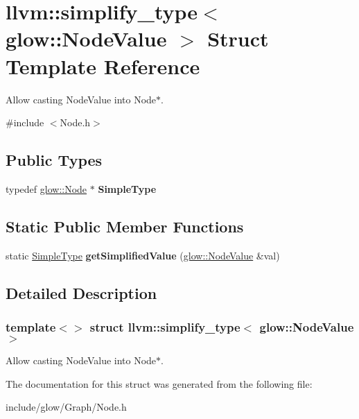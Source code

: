 \hypertarget{structllvm_1_1simplify__type_3_01glow_1_1_node_value_01_4}{}\section{llvm\+:\+:simplify\+\_\+type$<$ glow\+:\+:Node\+Value $>$ Struct Template Reference}
\label{structllvm_1_1simplify__type_3_01glow_1_1_node_value_01_4}


Allow casting Node\+Value into Node$\ast$.  




{\ttfamily \#include $<$Node.\+h$>$}

\subsection*{Public Types}
\begin{DoxyCompactItemize}
\item 
\mbox{\label{structllvm_1_1simplify__type_3_01glow_1_1_node_value_01_4_ac337e4d10cad8607f797b463a03d3c65}} 
typedef \hyperlink{classglow_1_1_node}{glow\+::\+Node} $\ast$ {\bfseries Simple\+Type}
\end{DoxyCompactItemize}
\subsection*{Static Public Member Functions}
\begin{DoxyCompactItemize}
\item 
\mbox{\label{structllvm_1_1simplify__type_3_01glow_1_1_node_value_01_4_a195a6248a7e70c86b6c6c61389f874e3}} 
static \hyperlink{classglow_1_1_node}{Simple\+Type} {\bfseries get\+Simplified\+Value} (\hyperlink{structglow_1_1_node_value}{glow\+::\+Node\+Value} \&val)
\end{DoxyCompactItemize}


\subsection{Detailed Description}
\subsubsection*{template$<$$>$\newline
struct llvm\+::simplify\+\_\+type$<$ glow\+::\+Node\+Value $>$}

Allow casting Node\+Value into Node$\ast$. 

The documentation for this struct was generated from the following file\+:\begin{DoxyCompactItemize}
\item 
include/glow/\+Graph/Node.\+h\end{DoxyCompactItemize}
